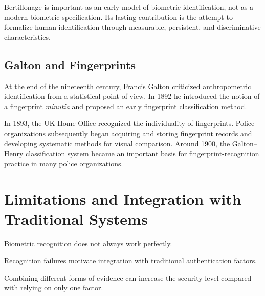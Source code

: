 \documentclass[11pt,a4paper,oneside]{report}
\begin{document}
\begin{remarkbox}
Bertillonage is important as an early model of biometric identification, not
as a modern biometric specification. Its lasting contribution is the attempt
to formalize human identification through measurable, persistent, and
discriminative characteristics.
\end{remarkbox}

\subsection{Galton and Fingerprints}

At the end of the nineteenth century, Francis Galton criticized
anthropometric identification from a statistical point of view. In 1892 he
introduced the notion of a fingerprint \emph{minutia} and proposed an early
fingerprint classification method.

In 1893, the UK Home Office recognized the individuality of fingerprints.
Police organizations subsequently began acquiring and storing fingerprint
records and developing systematic methods for visual comparison. Around 1900,
the Galton--Henry classification system became an important basis for
fingerprint-recognition practice in many police organizations.

\section{Limitations and Integration with Traditional Systems}
\label{subsec:integration}

Biometric recognition does not always work perfectly.

Recognition failures motivate integration with traditional authentication factors.

Combining different forms of evidence can increase the security level
compared with relying on only one factor.
\end{document}
